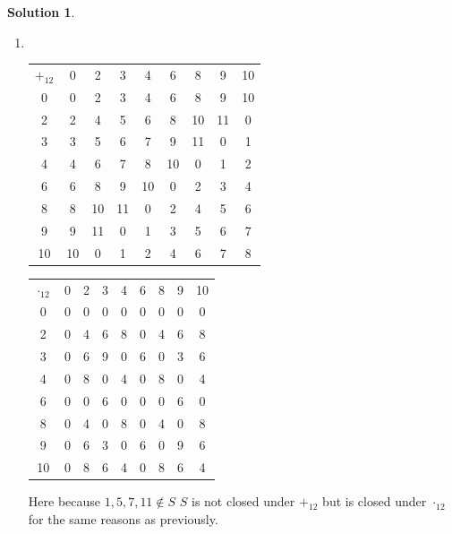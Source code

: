 \documentclass[10pt]{article}
\theoremstyle{definition}
\newtheorem{soln}{Solution}
\begin{document}
\begin{soln}
\begin{enumerate}[label=(\alph*)]
          \newpage
    \item ~\begin{center}
            \setlength\extrarowheight{3pt}
            \noindent\begin{tabular}{c | c c c c c c c c}
              $+_{12}$ & 0  & 2  & 3  & 4  & 6  & 8  & 9  & 10 \\
              \cline{1-9}
              0        & 0  & 2  & 3  & 4  & 6  & 8  & 9  & 10 \\
              2        & 2  & 4  & 5  & 6  & 8  & 10 & 11 & 0  \\
              3        & 3  & 5  & 6  & 7  & 9  & 11 & 0  & 1  \\
              4        & 4  & 6  & 7  & 8  & 10 & 0  & 1  & 2  \\
              6        & 6  & 8  & 9  & 10 & 0  & 2  & 3  & 4  \\
              8        & 8  & 10 & 11 & 0  & 2  & 4  & 5  & 6  \\
              9        & 9  & 11 & 0  & 1  & 3  & 5  & 6  & 7  \\
              10       & 10 & 0  & 1  & 2  & 4  & 6  & 7  & 8  \\
            \end{tabular}
            \qquad
            \noindent\begin{tabular}{c | c c c c c c c c}
              $\cdot_{12}$ & 0 & 2 & 3 & 4 & 6 & 8 & 9 & 10 \\
              \cline{1-9}
              0            & 0 & 0 & 0 & 0 & 0 & 0 & 0 & 0  \\
              2            & 0 & 4 & 6 & 8 & 0 & 4 & 6 & 8  \\
              3            & 0 & 6 & 9 & 0 & 6 & 0 & 3 & 6  \\
              4            & 0 & 8 & 0 & 4 & 0 & 8 & 0 & 4  \\
              6            & 0 & 0 & 6 & 0 & 0 & 0 & 6 & 0  \\
              8            & 0 & 4 & 0 & 8 & 0 & 4 & 0 & 8  \\
              9            & 0 & 6 & 3 & 0 & 6 & 0 & 9 & 6  \\
              10           & 0 & 8 & 6 & 4 & 0 & 8 & 6 & 4  \\
            \end{tabular}
          \end{center}
          Here because $1,5,7,11\notin S$ $S$ is not closed under $+_{12}$ but is closed under $\cdot_{12}$ for the same reasons as previously.

\end{enumerate}
\end{soln}
\end{document}
